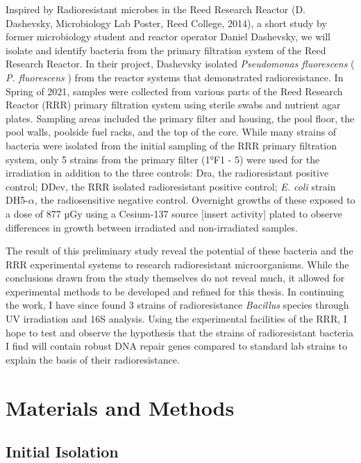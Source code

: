 \documentclass[12pt,twoside]{reedthesis}
\begin{document}
Inspired by Radioresistant microbes in the Reed Research Reactor (D. Dashevsky, Microbiology Lab Poster, Reed College, 2014), a short study by former microbiology student and reactor operator Daniel Dashevsky, we will isolate and identify bacteria from the primary filtration system of the Reed Research Reactor. In their project, Dashevsky isolated \emph{Pseudomonas fluorescens} ( \emph{P. fluorescens} ) from the reactor systems that demonstrated radioresistance. In Spring of 2021, samples were collected from various parts of the Reed Research Reactor (RRR) primary filtration system using sterile swabs and nutrient agar plates. Sampling areas included the primary filter and housing, the pool floor, the pool walls, poolside fuel racks, and the top of the core. While many strains of bacteria were isolated from the initial sampling of the RRR primary filtration system, only 5 strains from the primary filter (1°F1 - 5) were used for the irradiation in addition to the three controls: Dra, the radioresistant positive control; DDev, the RRR isolated radioresistant positive control; \emph{E. coli} strain DH5-\(\alpha\), the radiosensitive negative control. Overnight growths of these exposed to a dose of 877 µGy using a Cesium-137 source {[}insert activity{]} plated to observe differences in growth between irradiated and non-irradiated samples.

The result of this preliminary study reveal the potential of these bacteria and the RRR experimental systems to research radioresistant microorganisms. While the conclusions drawn from the study themselves do not reveal much, it allowed for experimental methods to be developed and refined for this thesis. In continuing the work, I have since found 3 strains of radioresistance \emph{Bacillus} species through UV irradiation and 16S analysis. Using the experimental facilities of the RRR, I hope to test and observe the hypothesis that the strains of radioresistant bacteria I find will contain robust DNA repair genes compared to standard lab strains to explain the basis of their radioresistance.

\hypertarget{mat-met}{%
\chapter{Materials and Methods}\label{mat-met}}

\hypertarget{initial-isolation}{%
\section{Initial Isolation}\label{initial-isolation}}
\end{document}
